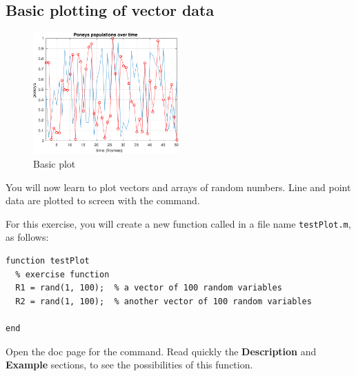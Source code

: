 \documentclass{article}
\begin{document}
\subsection{Basic plotting of vector data}

\begin{figure}
  \centering
  \includegraphics[width=0.5\textwidth]{basicplot.pdf}
  \caption{Basic plot}\label{fig:basic}
\end{figure}

You will now learn to plot vectors and arrays of random numbers.
Line and point data are plotted to screen with the  command.

For this exercise, you will create a new function called  in a file name \verb|testPlot.m|, as follows:
\begin{lstlisting}
function testPlot
  % exercise function
  R1 = rand(1, 100);  % a vector of 100 random variables
  R2 = rand(1, 100);  % another vector of 100 random variables

end
\end{lstlisting}

Open the doc page for the  command.
Read quickly the \textbf{Description} and \textbf{Example} sections, to see the possibilities of this function.
\end{document}
